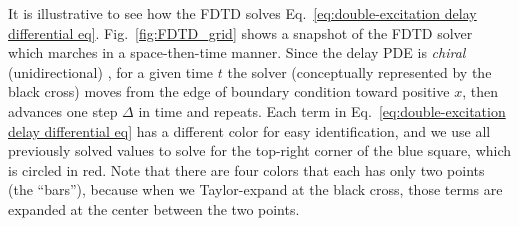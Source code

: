 \documentclass[12pt,letter,onecolumn,notitlepage]{article}
\begin{document}


It is illustrative to see how the FDTD solves Eq.~\eqref{eq:double-excitation delay differential eq}. Fig.~\ref{fig:FDTD_grid} shows a snapshot of the FDTD solver which marches in a space-then-time manner. Since the delay PDE is \emph{chiral} (unidirectional) \cite{FangNM17}, for a given time $t$ the solver (conceptually represented by the black cross) moves from the edge of boundary condition toward positive $x$, then advances one step $\Delta$ in time and repeats. Each term in Eq.~\eqref{eq:double-excitation delay differential eq} has a different color for easy identification, and we use all previously solved values to solve for the top-right corner of the blue square, which is circled in red. Note that there are four colors that each has only two points (the ``bars''), because when we Taylor-expand at the black cross, those terms are expanded at the center between the two points. 
\end{document}
